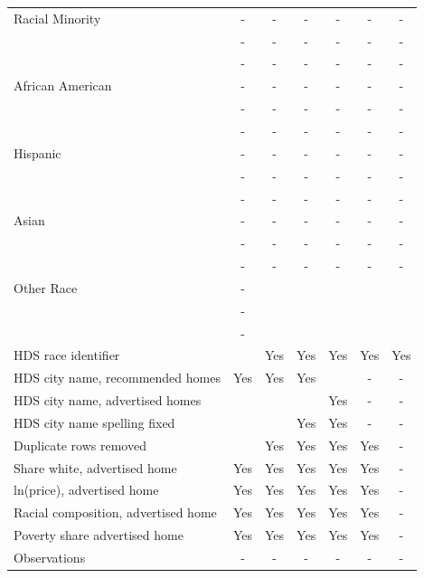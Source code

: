 \begin{table}[htbp]
{\begin{tabular}{l*{6}{c}}
\midrule
Racial Minority     &     -   &     -   &     -  &     -  &     -   & - \\
                    &   -   &    -   &   -   &    -   &    -   & - \\
                    & -   & -   & -   &-   & -   & - \\
\midrule
African American                   &     -   &     -   &     -  &     -  &     -   & - \\
                    &   -   &    -   &   -   &    -   &    -   & - \\
                    & -   & -   & -   &-   & -   & - \\
Hispanic                   &     -   &     -   &     -  &     -  &     -   & - \\
                    &   -   &    -   &   -   &    -   &    -   & - \\
                    & -   & -   & -   &-   & -   & - \\
Asian                   &     -   &     -   &     -  &     -  &     -   & - \\
                    &   -   &    -   &   -   &    -   &    -   & - \\
                    & -   & -   & -   &-   & -   & - \\
Other Race                   &     -   &        &       &       &        &  \\
                    &   -   &       &     &      &      &  \\
                    & -   &    &    &   &   &  \\
\midrule
HDS race identifier & & Yes & Yes & Yes & Yes & Yes \\
HDS city name, recommended homes & Yes & Yes & Yes & & - & -\\
HDS city name, advertised homes &  &  &  & Yes & - & -\\
HDS city name spelling fixed & & & Yes & Yes & - & -\\
Duplicate rows removed &  & Yes & Yes & Yes & Yes & - \\
\midrule
Share white, advertised home  & Yes & Yes & Yes & Yes & Yes & - \\
ln(price), advertised home  & Yes & Yes & Yes & Yes & Yes & - \\
Racial composition, advertised home & Yes & Yes & Yes & Yes & Yes & - \\
Poverty share advertised home & Yes & Yes & Yes & Yes & Yes & - \\
Observations        &        -   &        -   &        -   &        -   &        -   & - \\

\end{tabular}}
\end{table}
